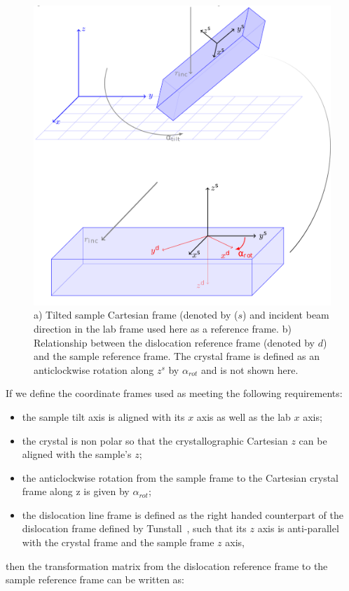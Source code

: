 \begin{figure}[ht]
    \centering
    \includegraphics[width=0.78\linewidth]{Figures/calculus.png}
    \caption[Forward geometry reference frames.]{a) Tilted sample Cartesian frame (denoted by ($s$) and incident beam direction in the lab frame used here as a reference frame. b) Relationship between the dislocation reference frame (denoted by $d$) and the sample reference frame. The crystal frame is defined as an anticlockwise rotation along $z^s$ by $\alpha_{rot}$ and is not shown here.}
    \label{fig:sampleframe}
\end{figure}

If we define the coordinate frames used as meeting the following requirements:
\begin{itemize}
    \item the sample tilt axis is aligned with its $x$ axis as well as the lab $x$ axis;
    \item the crystal is non polar so that the crystallographic Cartesian $z$ can be aligned with the sample's $z$;
    \item the anticlockwise rotation from the sample frame to the Cartesian crystal frame along z is given by $\alpha_{rot}$;
    \item the dislocation line frame is defined as the right handed counterpart of the dislocation frame defined by
Tunstall~\cite{Tunstall64}, such that its $z$ axis is anti-parallel with the crystal frame and the sample frame $z$ axis,
\end{itemize}
then the transformation matrix from the dislocation reference frame to the sample reference frame can be written as:

